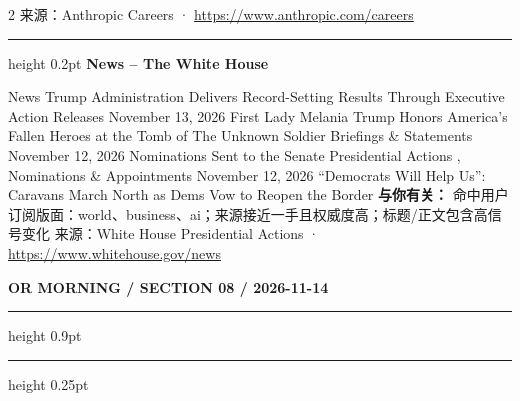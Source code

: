 \documentclass[10.5pt]{ctexart}
\begin{document}
\begin{multicols}{2}
{\footnotesize\color{ormuted} 来源：Anthropic Careers · \url{https://www.anthropic.com/careers}}
\vspace{2mm}
\hrule height 0.2pt
\vspace{2mm}
{\large\bfseries News – The White House}\par
News Trump Administration Delivers Record-Setting Results Through Executive Action Releases November 13, 2026 First Lady Melania Trump Honors America’s Fallen Heroes at the Tomb of The Unknown Soldier Briefings \& Statements November 12, 2026 Nominations Sent to the Senate Presidential Actions , Nominations \& Appointments November 12, 2026 “Democrats Will Help Us”: Caravans March North as Dems Vow to Reopen the Border
\textbf{与你有关：} 命中用户订阅版面：world、business、ai；来源接近一手且权威度高；标题/正文包含高信号变化
{\footnotesize\color{ormuted} 来源：White House Presidential Actions · \url{https://www.whitehouse.gov/news}}
\end{multicols}
\newpage
{\small\bfseries OR MORNING / SECTION 08 / 2026-11-14}
\vspace{2mm}
\hrule height 0.9pt
\vspace{1.5mm}
\hrule height 0.25pt
\vspace{4mm}
\end{document}
